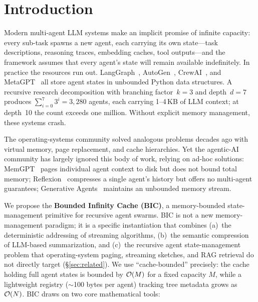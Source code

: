 
\section{Introduction}
\label{sec:introduction}

Modern multi-agent LLM systems make an implicit promise of infinite
capacity: every sub-task spawns a new agent, each carrying its own
state---task descriptions, reasoning traces, embedding caches, tool
outputs---and the framework assumes that every agent's state will
remain available indefinitely.  In practice the resources run out.
LangGraph~\citep{langgraph2024}, AutoGen~\citep{wu2023autogen},
CrewAI~\citep{crewai2024}, and MetaGPT~\citep{hong2023metagpt} all
store agent states in unbounded Python data structures.  A recursive
research decomposition with branching factor~$k=3$ and depth~$d=7$
produces $\sum_{i=0}^{7}3^i = 3{,}280$ agents, each carrying 1--4\,KB
of LLM context; at depth~10 the count exceeds one million.  Without
explicit memory management, these systems crash.

The operating-systems community solved analogous problems decades ago
with virtual memory, page replacement, and cache hierarchies.  Yet the
agentic-AI community has largely ignored this body of work, relying on
ad-hoc solutions: MemGPT~\citep{packer2023memgpt} pages individual
agent context to disk but does not bound total memory;
Reflexion~\citep{shinn2023reflexion} compresses a single agent's
history but offers no multi-agent guarantees; Generative
Agents~\citep{park2023generative} maintains an unbounded memory stream.

We propose the \textbf{Bounded Infinity Cache (BIC)}, a memory-bounded
state-management primitive for recursive agent swarms.  BIC is not a
new memory-management paradigm; it is a specific instantiation that
combines (a)~the deterministic addressing of streaming algorithms,
(b)~the semantic compression of LLM-based summarization, and (c)~the
recursive agent state-management problem that operating-system
paging, streaming sketches, and RAG retrieval do not directly target
(\S\ref{sec:related}).  We use ``cache-bounded'' precisely: the cache
holding full agent states is bounded by $\mathcal{O}(M)$ for a fixed capacity
$M$, while a lightweight registry ($\sim$100 bytes per agent)
tracking tree metadata grows as $\mathcal{O}(N)$.  BIC draws on two core
mathematical tools:

